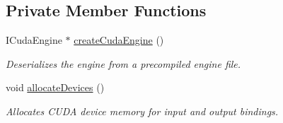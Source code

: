 \subsection*{Private Member Functions}
\begin{DoxyCompactItemize}
\item 
I\+Cuda\+Engine $\ast$ \hyperlink{classInferenceEngine_a5f66425c0553c541353a634f991c1c00}{create\+Cuda\+Engine} ()
\begin{DoxyCompactList}\small\item\em Deserializes the engine from a precompiled engine file. \end{DoxyCompactList}\item 
void \hyperlink{classInferenceEngine_a3937cf84f22d0652cd5fe734d9b92290}{allocate\+Devices} ()
\begin{DoxyCompactList}\small\item\em Allocates C\+U\+DA device memory for input and output bindings. \end{DoxyCompactList}\end{DoxyCompactItemize}
